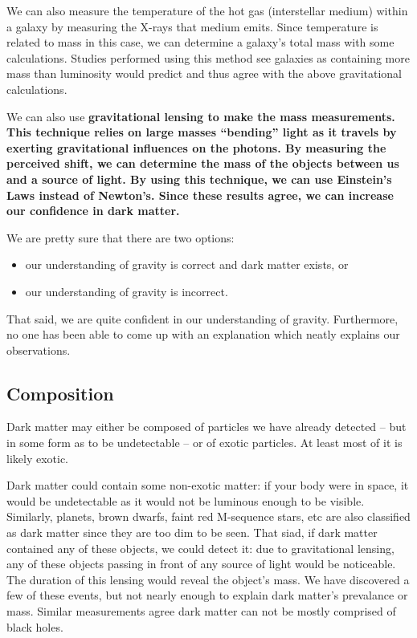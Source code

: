 We can also measure the temperature of the hot gas (interstellar medium) within a galaxy by measuring the X-rays that medium emits. Since temperature is related to mass in this case, we can determine a galaxy's total mass with some calculations. Studies performed using this method see galaxies as containing more mass than luminosity would predict and thus agree with the above gravitational calculations.

We can also use \bf{gravitational lensing} to make the mass measurements. This technique relies on large masses ``bending'' light as it travels by exerting gravitational influences on the photons. By measuring the perceived shift, we can determine the mass of the objects between us and a source of light. By using this technique, we can use Einstein's Laws instead of Newton's. Since these results agree, we can increase our confidence in dark matter.

We are pretty sure that there are two options:
\begin{itemize}
\item our understanding of gravity is correct and dark matter exists, or
\item our understanding of gravity is incorrect.
\end{itemize}

That said, we are quite confident in our understanding of gravity. Furthermore, no one has been able to come up with an explanation which neatly explains our observations.

\subsection{Composition}
Dark matter may either be composed of particles we have already detected -- but in some form as to be undetectable -- or of exotic particles. At least most of it is likely exotic.

Dark matter could contain some non-exotic matter: if your body were in space, it would be undetectable as it would not be luminous enough to be visible. Similarly, planets, brown dwarfs, faint red M-sequence stars, etc are also classified as dark matter since they are too dim to be seen. That siad, if dark matter contained any of these objects, we could detect it: due to gravitational lensing, any of these objects passing in front of any source of light would be noticeable. The duration of this lensing would reveal the object's mass. We have discovered a few of these events, but not nearly enough to explain dark matter's prevalance or mass. Similar measurements agree dark matter can not be mostly comprised of black holes.

